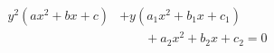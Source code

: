 \begin{proposition}
\[
    \begin{aligned}y^2(ax^2+bx+c)&+y(a_1x^2+b_1x+c_1)\\&\qquad+a_2x^2+b_2x+c_2=0\end{aligned}
\]
\end{proposition}
